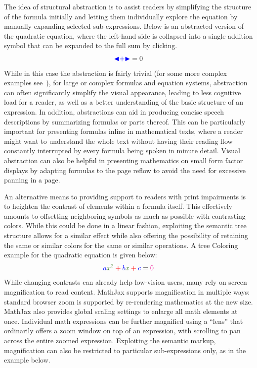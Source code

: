 \documentclass{sig-alternate}
\def\collapse#1{\textcolor{blue}{\ensuremath{\mathord{\blacktriangleleft}
\mathord{#1}
\mathord{\blacktriangleright}}}}
\begin{document}
 The idea of structural abstraction is to
assist readers by simplifying the structure of the formula initially and letting
them individually explore the equation by manually expanding selected
sub-expressions. Below is an abstracted version of the quadratic equation, where
the left-hand side is collapsed into a single addition symbol that can be
expanded to the full sum by clicking.
\[\collapse{+}=0\]
While in this case the abstraction is fairly trivial (for some more complex
examples see~\cite{cervone2016towards}), for large or complex formulas and
equation systems, abstraction can often significantly simplify the visual
appearance, leading to less cognitive load for a reader, as well as a better
understanding of the basic structure of an expression. In addition, abstractions
can aid in producing concise speech descriptions by summarizing formulas
or parts thereof. This can be particularly important for presenting formulas
inline in mathematical texts, where a reader might want to understand the whole
text without having their reading flow constantly interrupted by every formula
being spoken in minute detail. Visual abstraction can also be helpful in
presenting mathematics on small form factor displays by adapting formulas to the
page reflow to avoid the need for excessive panning in a page.

An alternative means to providing support to readers with print impairments is
to heighten the contrast of elements within a formula itself. This effectively
amounts to offsetting neighboring symbols as much as possible with contrasting
colors. While this could be done in a linear fashion, exploiting the semantic
tree structure allows for a similar effect while also offering the possibility
of retaining the same or similar colors for the same or similar operations. A
tree Coloring example for the quadratic equation is given below:
\[\color{blue}a \color{OliveGreen}x^2 \color{red}+ \color{blue}b
  \color{OliveGreen}x \color{red}+ \color{blue}c \color{black}= \color{magenta}0\]
While changing contrasts can already help low-vision users, many rely on screen
magnification to read content.  MathJax supports magnification in multiple ways:
standard browser zoom is supported by re-rendering mathematics at the new size.
MathJax also provides global scaling settings to enlarge all math elements at
once.  Individual math expressions can be further magnified using a ``lens''
that ordinarily offers a zoom window on top of an expression, with scrolling to
pan across the entire zoomed expression. Exploiting the semantic markup,
magnification can also be restricted to particular sub-expressions only, as in
the example below.
\end{document}
